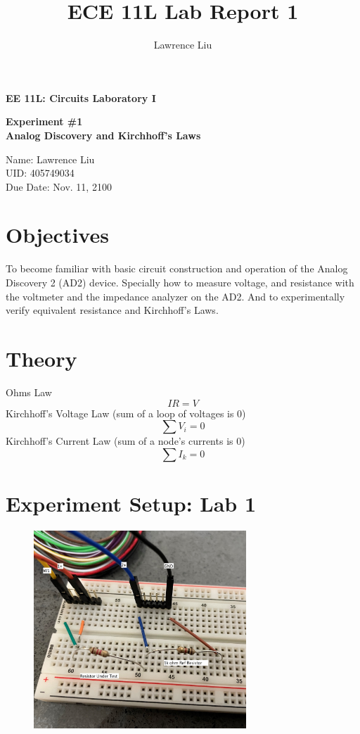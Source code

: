 \documentclass[12pt]{article}
\title{ECE 11L Lab Report 1}
\author{Lawrence Liu}
\begin{document}
\begin{titlepage}
   \begin{center}
       \vspace*{1cm}

       \textbf{EE 11L: Circuits Laboratory I}

       \vspace{2cm}

       \textbf{Experiment \#1}\\
       \textbf{Analog Discovery and Kirchhoff’s Laws}

            
       \vspace{4cm}
     
            
       Name: Lawrence Liu\\
		UID: 405749034\\
		Due Date: Nov. 11, 2100
            
   \end{center}
\end{titlepage}
\section*{Objectives}
To become familiar with basic circuit construction and operation of the Analog  Discovery 2 (AD2) device. Specially how to measure voltage, and resistance with the voltmeter and the impedance analyzer on the AD2. And to experimentally verify equivalent resistance and Kirchhoff’s Laws.
\section*{Theory}
Ohms Law
$$IR=V$$
Kirchhoff’s Voltage Law (sum of a loop of voltages is 0)
$$\sum V_i=0$$
Kirchhoff’s Current Law (sum of a node's currents is 0)
$$\sum I_k=0$$
\pagebreak
\section*{Experiment Setup: Lab 1}
\begin{figure}[h]
\includegraphics[width=8cm]{ResistorMeasurment}
\centering
\end{figure}
\end{document}
